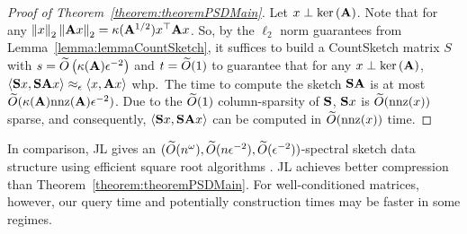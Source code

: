 \begin{proof}[Proof of Theorem~\ref{theorem:theoremPSDMain}] 

Let $x \perp \mathrm{ker}\left(\mathbf{A}\right)$. Note that for any $\left\Vert x \right\Vert_2 \left\Vert \mathbf{A} x \right\Vert_2 = \kappa(\mathbf{A}^{1/2})x^\top \mathbf{A} x$. So, by the $\ell_2$ norm guarantees from Lemma~\ref{lemma:lemmaCountSketch}, it suffices to build a CountSketch matrix $S$ with $s = \widetilde{O}\left(\kappa({\mathbf{A}})\epsilon^{-2}\right)$ and $t = \widetilde{O}( {1} )$ to guarantee that for any $x \perp \mathrm{ker}\left(\mathbf{A}\right)$, $\langle \mathbf{S} x, \mathbf{S} \mathbf{A} x \rangle \approx_\epsilon \langle x, \mathbf{A} x \rangle$ whp.\ The time to compute the sketch $\mathbf{S} \mathbf{A}$ is at most $\widetilde{O}( {\kappa(\mathbf{A})\mathrm{nnz}(\mathbf{A})\epsilon^{-2}} )$. Due to the $\widetilde{O}( {1} )$ column-sparsity of $\mathbf{S}$, $\mathbf{S} x$ is $\widetilde{O}( {\mathrm{nnz}(x)} )$ sparse, and consequently, $\langle \mathbf{S} x, \mathbf{S} \mathbf{A} x \rangle$ can be computed in $\widetilde{O}( {\mathrm{nnz}(x)} )$ time. 
\end{proof}

In comparison, JL gives an $(\widetilde{O}( {n^\omega} ), \widetilde{O}( {n\epsilon^{-2}} ), \widetilde{O}( {\epsilon^{-2}} ))$-spectral sketch data structure using efficient square root algorithms \cite{jain2017global}. JL achieves better compression than Theorem~\ref{theorem:theoremPSDMain}. For well-conditioned matrices, however, our query time and potentially construction times may be faster in some regimes.  

